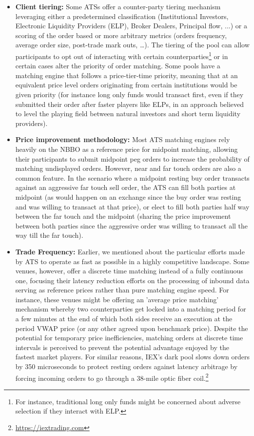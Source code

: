 \begin{itemize}
\item{\textbf{Client tiering:}} Some ATSs offer a counter-party tiering mechanism leveraging either a predetermined classification (Institutional Investors, Electronic Liquidity Providers (ELP), Broker Dealers, Principal flow, ...) or a scoring of the order based or more arbitrary metrics (orders frequency, average order size, post-trade mark outs, \dots). The tiering of the pool can allow participants to opt out of interacting with certain counterparties\footnote{For instance, traditional long only funds might be concerned about adverse selection if they interact with ELP.} or in certain cases alter the priority of order matching. Some pools have a matching engine that follows a price-tier-time priority, meaning that at an equivalent price level orders originating from certain institutions would be given priority (for instance long only funds would transact first, even if they submitted their order after faster players like ELPs, in an approach believed to level the playing field between natural investors and short term liquidity providers). 

\item{\textbf{Price improvement methodology:}} Most ATS matching engines rely heavily on the NBBO as a reference price for midpoint matching, allowing their participants to submit midpoint peg orders to increase the probability of matching undisplayed orders. However, near and far touch orders are also a common feature. In the scenario where a midpoint resting buy order transacts against an aggressive far touch sell order, the ATS can fill both parties at midpoint (as would happen on an exchange since the buy order was resting and was willing to transact at that price), or elect to fill both parties half way between the far touch and the midpoint (sharing the price improvement between both parties since the aggressive order was willing to transact all the way till the far touch). 

\item{\textbf{Trade Frequency:}} Earlier, we mentioned about the particular efforts made by ATS to operate as fast as possible in a highly competitive landscape. Some venues, however, offer a discrete time matching instead of a fully continuous one, focusing their latency reduction efforts on the processing of inbound data serving as reference prices rather than pure matching engine speed. For instance, these venues might be offering an 'average price matching' mechanism whereby two counterparties get locked into a matching period for a few minutes at the end of which both sides receive an execution at the period VWAP price (or any other agreed upon benchmark price). Despite the potential for temporary price inefficiencies, matching orders at discrete time intervals is perceived to prevent the potential advantage enjoyed by the fastest market players. For similar reasons, IEX's dark pool slows down orders by 350 microseconds to protect resting orders against latency arbitrage by forcing incoming orders to go through a 38-mile optic fiber coil.\footnote{\url{https://iextrading.com}}


\end{itemize}
